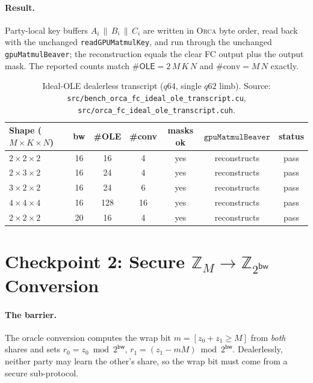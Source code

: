 \documentclass[11pt]{article}
\newcommand{\Z}{\mathbb{Z}}
\newcommand{\modtwo}{\Z_{2^{\mathsf{bw}}}}
\newcommand{\Orca}{\textsc{Orca}}
\newcommand{\OLE}{\mathsf{OLE}}
\begin{document}
\paragraph{Result.} Party-local key buffers $A_i\,\|\,B_i\,\|\,C_i$ are written
in \Orca{} byte order, read back with the unchanged \texttt{readGPUMatmulKey},
and run through the unchanged \texttt{gpuMatmulBeaver}; the reconstruction equals
the clear FC output plus the output mask. The reported counts match
$\#\OLE = 2\,M\,K\,N$ and $\#\text{conv}=M\,N$ exactly.

\begin{table}[h]
\centering\small
\begin{tabular}{lcccccc}
\toprule
Shape ($M{\times}K{\times}N$) & bw & \#OLE & \#conv & masks ok & $\texttt{gpuMatmulBeaver}$ & status \\
\midrule
$2{\times}2{\times}2$ & 16 & 16  & 4  & yes & reconstructs & pass \\
$2{\times}3{\times}2$ & 16 & 24  & 4  & yes & reconstructs & pass \\
$3{\times}2{\times}2$ & 16 & 24  & 6  & yes & reconstructs & pass \\
$4{\times}4{\times}4$ & 16 & 128 & 16 & yes & reconstructs & pass \\
$2{\times}2{\times}2$ & 20 & 16  & 4  & yes & reconstructs & pass \\
\bottomrule
\end{tabular}
\caption{Ideal-OLE dealerless transcript ($q64$, single $q62$ limb). Source:
\texttt{src/bench\_orca\_fc\_ideal\_ole\_transcript.cu},
\texttt{src/orca\_fc\_ideal\_ole\_transcript.cuh}.}
\label{tab:transcript}
\end{table}

\section{Checkpoint 2: Secure $\Z_M\!\to\!\modtwo$ Conversion}
\label{sec:convert}

\paragraph{The barrier.} The oracle conversion computes the wrap bit
$m=[z_0+z_1\ge M]$ from \emph{both} shares and sets $r_0=z_0\bmod 2^{\mathsf{bw}}$,
$r_1=(z_1-mM)\bmod 2^{\mathsf{bw}}$. Dealerlessly, neither party may learn the
other's share, so the wrap bit must come from a secure sub-protocol.
\end{document}
